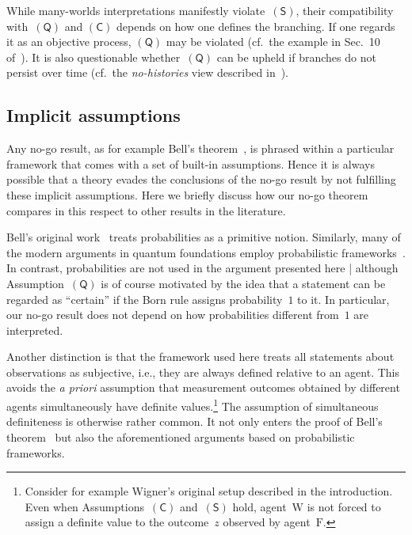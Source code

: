 \documentclass{article}
\theoremstyle{mystyle}
\theoremstyle{definition}
\newcommand*{\Friend}{\mathrm{F}}
\newcommand*{\Wigner}{\mathrm{W}}
\newcommand*{\QT}{\mathsf{(Q)}}
\newcommand*{\SW}{\mathsf{(S)}}
\newcommand*{\SelfCons}{\mathsf{(C)}}
\begin{document}
While many-worlds interpretations manifestly violate~$\SW$, their compatibility with~$\QT$ and $\SelfCons$ depends on how one defines the branching. If one regards it as an objective process, $\QT$ may be violated  (cf.\ the example in Sec.~10 of~\cite{Vaidman98}).  It is also questionable whether~$\QT$ can be upheld if branches do not persist over time (cf.\ the \emph{no-histories} view described in~\cite{Butterfield95}).

\smallskip
 
\subsection{Implicit assumptions}

Any no-go result, as for example Bell's theorem~\cite{Bell66}, is phrased within a particular framework that comes with a set of built-in assumptions. Hence it is always possible that a theory evades the conclusions of the no-go result by not fulfilling these implicit assumptions. Here we briefly discuss how our no-go theorem compares in this respect to other results in the literature. 

Bell's original work~\cite{Bell66} treats probabilities as a primitive notion. Similarly, many of the modern arguments in quantum foundations  employ  probabilistic frameworks~\cite{Barrett07,Hardy11,ChDaPe11,MasMul11,ColRen12,PuBaRu12,LeiSpe13,BarWil16}.  In contrast, probabilities are not used in the argument presented here | although Assumption~$\QT$ is of course motivated by the idea that a statement can be regarded as ``certain'' if the Born rule assigns probability~$1$ to it. In particular, our no-go result does not depend  on how probabilities different from~$1$ are interpreted.  

Another distinction is that the framework used here treats all statements about observations as subjective, i.e., they are always defined relative to an agent. This avoids the  \emph{a priori} assumption that  measurement outcomes obtained by  different agents simultaneously have definite values.\footnote{Consider for example Wigner's original setup described in the introduction. Even when Assumptions~$\SelfCons$ and~$\SW$ hold,  agent~$\Wigner$ is not  forced to assign a definite value to the outcome~$z$ observed by agent~$\Friend$.} The assumption of simultaneous definiteness is otherwise rather common. It not only enters the proof of Bell's theorem~\cite{Bell66} but also the aforementioned arguments based on probabilistic frameworks. 
\end{document}
